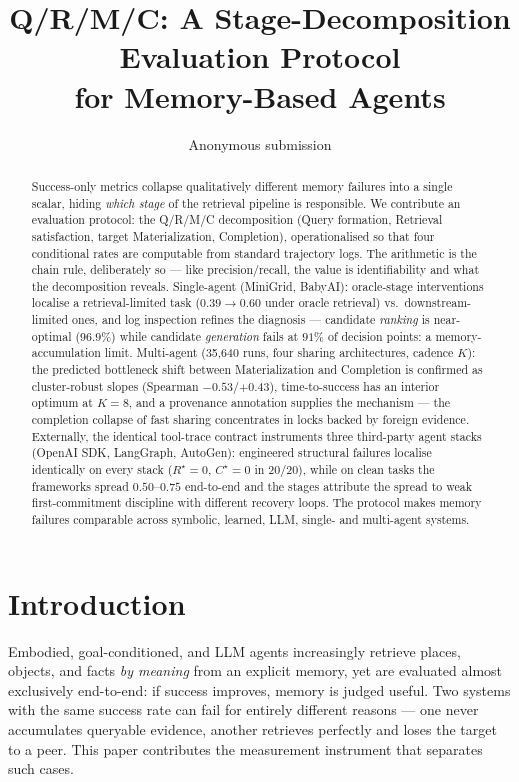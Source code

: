 \documentclass[letterpaper]{article} %
\title{Q/R/M/C: A Stage-Decomposition Evaluation Protocol\\for Memory-Based Agents}
\author{Anonymous submission}
\begin{document}
\maketitle

\begin{abstract}
Success-only metrics collapse qualitatively different memory failures
into a single scalar, hiding \emph{which stage} of the retrieval
pipeline is responsible. We contribute an evaluation protocol: the
Q/R/M/C decomposition (Query formation, Retrieval satisfaction, target
Materialization, Completion), operationalised so that four conditional
rates are computable from standard trajectory logs. The arithmetic is
the chain rule, deliberately so --- like precision/recall, the value is
identifiability and what the decomposition reveals. Single-agent
(MiniGrid, BabyAI): oracle-stage interventions localise a
retrieval-limited task ($0.39\!\to\!0.60$ under oracle retrieval) vs.\
downstream-limited ones, and log inspection refines the diagnosis ---
candidate \emph{ranking} is near-optimal ($96.9\%$) while candidate
\emph{generation} fails at $91\%$ of decision points: a
memory-accumulation limit. Multi-agent (35{,}640 runs, four sharing
architectures, cadence $K$): the predicted bottleneck shift between
Materialization and Completion is confirmed as cluster-robust slopes
(Spearman $-0.53$/$+0.43$), time-to-success has an interior optimum at
$K{=}8$, and a provenance annotation supplies the mechanism --- the
completion collapse of fast sharing concentrates in locks backed by
foreign evidence. Externally, the identical tool-trace contract
instruments three third-party agent stacks (OpenAI SDK, LangGraph,
AutoGen): engineered structural failures localise identically on every
stack ($R^\star{=}0$, $C^\star{=}0$ in $20/20$), while on clean tasks
the frameworks spread $0.50$--$0.75$ end-to-end and the stages
attribute the spread to weak first-commitment discipline with
different recovery loops. The protocol makes memory failures
comparable across symbolic, learned, LLM, single- and multi-agent
systems.
\end{abstract}

\section{Introduction}

Embodied, goal-conditioned, and LLM agents increasingly retrieve
places, objects, and facts \emph{by meaning} from an explicit memory,
yet are evaluated almost exclusively end-to-end: if success improves,
memory is judged useful. Two systems with the same success rate can
fail for entirely different reasons --- one never accumulates
queryable evidence, another retrieves perfectly and loses the target
to a peer. This paper contributes the measurement instrument that
separates such cases.
\end{document}
